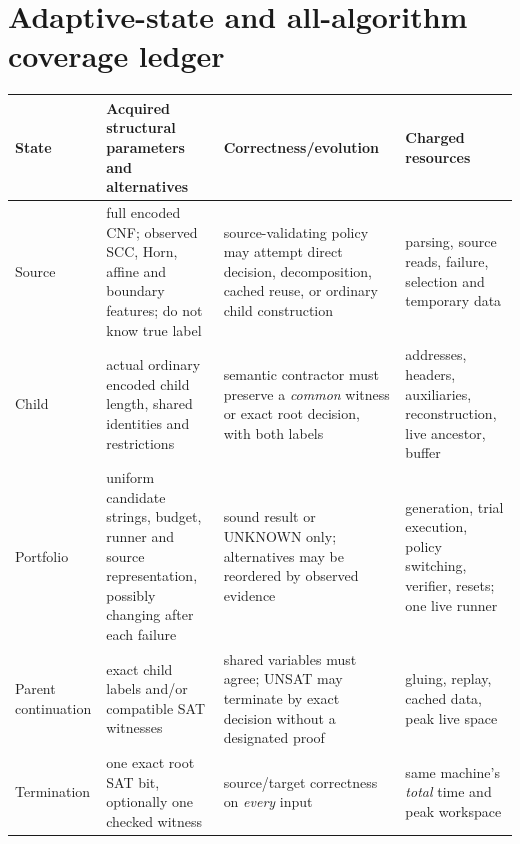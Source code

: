 \documentclass[11pt]{article}
\begin{document}
\section{Adaptive-state and all-algorithm coverage ledger}
\begin{center}\small
\begin{tabular}{p{.13\linewidth}p{.26\linewidth}p{.30\linewidth}p{.23\linewidth}}
\toprule
State & Acquired structural parameters and alternatives & Correctness/evolution & Charged resources\\\midrule
Source & full encoded CNF; observed SCC, Horn, affine and boundary features; do not know true label & source-validating policy may attempt direct decision, decomposition, cached reuse, or ordinary child construction & parsing, source reads, failure, selection and temporary data\\
Child & actual ordinary encoded child length, shared identities and restrictions & semantic contractor must preserve a \emph{common} witness or exact root decision, with both labels & addresses, headers, auxiliaries, reconstruction, live ancestor, buffer\\
Portfolio & uniform candidate strings, budget, runner and source representation, possibly changing after each failure & sound result or UNKNOWN only; alternatives may be reordered by observed evidence & generation, trial execution, policy switching, verifier, resets; one live runner\\
Parent continuation & exact child labels and/or compatible SAT witnesses & shared variables must agree; UNSAT may terminate by exact decision without a designated proof & gluing, replay, cached data, peak live space\\
Termination & one exact root SAT bit, optionally one checked witness & source/target correctness on \emph{every} input & same machine's \emph{total} time and peak workspace\\
\bottomrule
\end{tabular}
\end{center}
\end{document}
